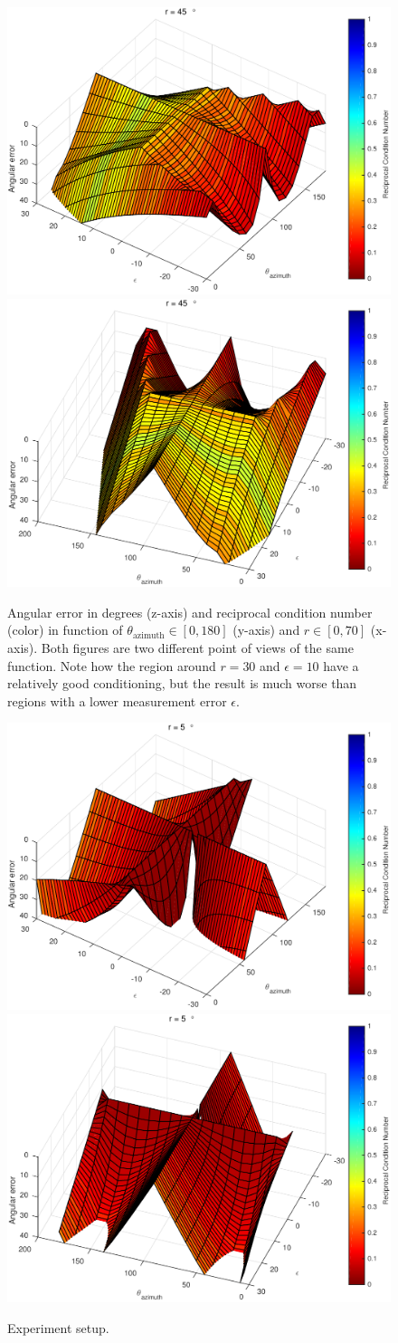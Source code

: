 \documentclass{report}
\begin{document}
\begin{figure}
  \centering
  \includegraphics[width=0.45\linewidth]{q3_experiment_2_view_1.pdf}
  \includegraphics[width=0.45\linewidth]{q3_experiment_2_view_2.pdf}
  \caption[Experiment 2]
   {Angular error in degrees (z-axis) and reciprocal condition number (color) in function of $\theta_{\mathrm{azimuth}} \in \left[0, 180\right]$ (y-axis) and $r \in \left[0, 70\right]$ (x-axis). Both figures are two different point of views of the same function. Note how the region around $r = 30$ and $\epsilon = 10$ have a relatively good conditioning, but the result is much worse than regions with a lower measurement error $\epsilon$.}
  \label{q3:exp2}
\end{figure}

\begin{figure}
  \centering
  \includegraphics[width=0.45\linewidth]{q3_experiment_2a_view_1.pdf}
  \includegraphics[width=0.45\linewidth]{q3_experiment_2a_view_2.pdf}
  \caption[Experiment 2 on extreme values]
   {Experiment setup.}
  \label{q3:exp2a}
\end{figure}
\end{document}
